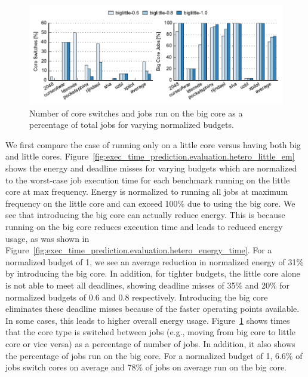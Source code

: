 \begin{figure}
  \begin{center}
    \includegraphics{exec_time_prediction/data/hetero_little_counts.pdf}
    \caption{Number of core switches and jobs run on the big core as a
    percentage of total jobs for varying normalized budgets.}
    \label{fig:exec_time_prediction.evaluation.hetero_little_counts}
  \end{center}
\end{figure}

We first compare the case of running only on a little core versus having both
big and little cores.
Figure~\ref{fig:exec_time_prediction.evaluation.hetero_little_em} shows the
energy and deadline misses for varying budgets which are normalized to the
worst-case job execution time for each benchmark running on the little core at
max frequency. Energy is normalized to running all jobs at maximum frequency on
the little core and can exceed 100\% due to using the big core. We see that
introducing the big core can actually reduce energy. This is because running on
the big core reduces execution time and leads to reduced energy usage, as was
shown in Figure~\ref{fig:exec_time_prediction.evaluation.hetero_energy_time}.
For a normalized budget of 1, we see an average reduction in normalized energy
of 31\% by introducing the big core. In addition, for tighter budgets, the
little core alone is not able to meet all deadlines, showing deadline misses of
35\% and 20\% for normalized budgets of 0.6 and 0.8 respectively. Introducing
the big core eliminates these deadline misses because of the faster operating
points available. In some cases, this leads to higher overall energy usage.
Figure~\ref{fig:exec_time_prediction.evaluation.hetero_little_counts} shows
times that the core type is switched between jobs (e.g., moving from big core
to little core or vice versa) as a percentage of number of jobs. In addition,
it also shows the percentage of jobs run on the big core. For a normalized
budget of 1, 6.6\% of jobs switch cores on average and 78\% of jobs on average
run on the big core.

